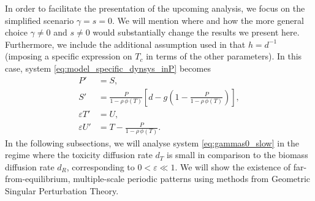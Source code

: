 \documentclass[a4paper,10pt,abstract=true,parskip=true]{scrartcl}
\theoremstyle{remark}
\numberwithin{equation}{section}
\numberwithin{thm}{section}
\newcommand{\eps}{\varepsilon}
\begin{document}
In order to facilitate the presentation of the upcoming analysis, we focus on the simplified scenario $\gamma=s=0$. We will mention where and how the more general choice $\gamma \neq 0$ and $s \neq 0$ would substantially change the results we present here.
Furthermore, we include the additional assumption used in \cite{GIS_2026} that $h=d^{-1}$ (imposing a specific expression on $T_c$ in terms of the other parameters). In this case, system \eqref{eq:model_specific_dynsys_inP} becomes
\begin{subequations}\label{eq:gammas0_slow}
    \begin{align}
        P' &= S,\\
        S' &= \frac{P}{1 - \rho\,\phi(T)}\left[d - g \left(1-\frac{P}{1 - \rho\,\phi(T)}\right)\right],\\
        \eps T' &= U,\\
        \eps U' &= T - \frac{P}{1 - \rho\,\phi(T)}.
    \end{align}
\end{subequations}
In the following subsections, we will analyse system \eqref{eq:gammas0_slow} in the regime where the toxicity diffusion rate $d_T$ is small in comparison to the biomass diffusion rate $d_R$, corresponding to $0< \eps \ll 1$. We will show the existence of far-from-equilibrium, multiple-scale periodic patterns using methods from Geometric Singular Perturbation Theory.

\end{document}
